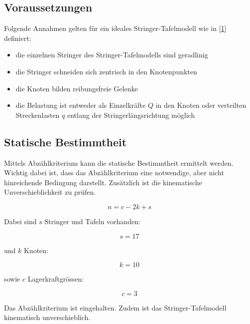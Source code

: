 \documentclass[
  12pt,
  letterpaper,
  DIV=11,
  egregdoesnotlikesansseriftitles]{scrartcl}
\providecommand{\tightlist}{%
  \setlength{\itemsep}{0pt}\setlength{\parskip}{0pt}}\usepackage{longtable,booktabs,array}
\begin{document}
\hypertarget{voraussetzungen}{%
\subsection{Voraussetzungen}\label{voraussetzungen}}

Folgende Annahmen gelten für ein ideales Stringer-Tafelmodell wie in
{[}\protect\hyperlink{ref-Heinzmann2019}{1}{]} definiert:

\begin{itemize}
\tightlist
\item
  die einzelnen Stringer des Stringer-Tafelmodells sind geradlinig
\item
  die Stringer schneiden sich zentrisch in den Knotenpunkten
\item
  die Knoten bilden reibungsfreie Gelenke
\item
  die Belastung ist entweder als Einzelkräfte \(Q\) in den Knoten oder
  verteilten Streckenlasten \(q\) entlang der Stringerlängsrichtung
  möglich
\end{itemize}

\hypertarget{statische-bestimmtheit}{%
\subsection{Statische Bestimmtheit}\label{statische-bestimmtheit}}

Mittels Abzählkriterium kann die statische Bestimmtheit ermittelt
werden. Wichtig dabei ist, dass das Abzählkriterium eine notwendige,
aber nicht hinreichende Bedingung darstellt. Zusätzlich ist die
kinematische Unverschieblichkeit zu prüfen.

\begin{equation}n = c - 2 k + s\end{equation}

Dabei sind \(s\) Stringer und Tafeln vorhanden:

\begin{equation}s = 17\end{equation}

und \(k\) Knoten:

\begin{equation}k = 10\end{equation}

sowie \(c\) Lagerkraftgrössen:

\begin{equation}c = 3\end{equation}

Das Abzählkriterium ist eingehalten. Zudem ist das Stringer-Tafelmodell
kinematisch unverschieblich.
\end{document}
